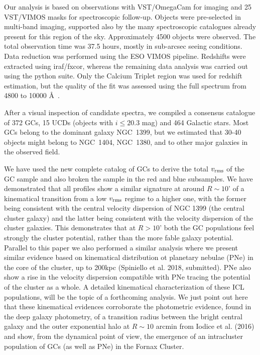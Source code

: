 \documentclass[useAMS,usenatbib]{mn2e}
\begin{document}
Our analysis is based on observations with VST/OmegaCam for imaging and 25 VST/VIMOS masks for spectroscopic follow-up. Objects were pre-selected in multi-band imaging, supported also by the many spectroscopic catalogues already present for this region of the sky.  Approximately 4500 objects were observed. The total observation time was 37.5 hours, mostly in sub-arcsec seeing conditions. Data reduction was performed using the ESO VIMOS pipeline. Redshifts were extracted using iraf/fxcor, whereas the remaining data analysis was carried out using the python suite. Only the Calcium Triplet region was used for redshift estimation, but the quality of the fit was assessed using the full spectrum from 4800 to 10000 \AA\ .

After a visual inspection of candidate spectra, we compiled a consensus catalogue of 372 GCs, 15 UCDs (objects with $i \le 20.3$ mag) and 464 Galactic stars. Most GCs belong to the dominant galaxy NGC~1399, but we estimated that 30-40 objects might belong to NGC~1404, NGC~1380, and to other major galaxies in the observed field.

We have used the new complete catalog of GCs to derive the total  $v_{\rm rms}$ of the GC sample and also broken the sample in the red and blue subsamples.
We have demonstrated that all profiles show a similar signature at around $R\sim10’$ of a kinematical transition from a low $v_{\rm rms}$ regime to a higher one, with the former being consistent with the central velocity dispersion of NGC 1399 (the central cluster galaxy) and the latter being consistent with the velocity dispersion of the cluster galaxies. This demonstrates that at $R>10’$ both the GC populations feel strongly the cluster potential, rather than the more fable galaxy potential. Parallel to this paper we also performed a similar analysis where we present similar evidence based on kinematical distribution ot planetary nebulae (PNe) in the core of the cluster, up to 200kpc (Spiniello et al. 2018, submitted). PNe also show a rise in the velocity dispersion compatible with PNe tracing the potential of the cluster as a whole. A detailed kinematical characterization of these ICL populations, will be the topic of a forthcoming analysis. We just point out here that these kinematical evidences corroborate the photometric evidence, found in the deep galaxy photometry, of a transition radius between the bright central galaxy and the outer exponential halo at $R\sim10$ arcmin from Iodice et al. (2016) and show, from the dynamical point of view, the emergence of an intracluster population of GCs (as well as PNe) in the Fornax Cluster.




\end{document}
